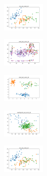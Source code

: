 \begin{figure}[H]    
    \centering
    \begin{subfigure}
        \centering
        \includegraphics[width=0.234\textwidth]{img/bl/iris_set_const_20_949004259_clust.png}
    \end{subfigure}
    \hfill
    \begin{subfigure}
        \centering
        \includegraphics[width=0.234\textwidth]{img/bl/ecoli_set_const_20_949004259_clust.png}
    \end{subfigure}
    \hfill
    \begin{subfigure}
        \centering
        \includegraphics[width=0.234\textwidth]{img/bl/rand_set_const_20_949004259_clust.png}
    \end{subfigure}
    \hfill
    \begin{subfigure}
        \centering
        \includegraphics[width=0.234\textwidth]{img/bl/newthyroid_set_const_20_949004259_clust.png}
    \end{subfigure}
    \hfill
    \begin{subfigure}
        \centering
        \includegraphics[width=0.234\textwidth]{img/bl/iris_set_const_20_589741062_clust.png}
    \end{subfigure}
    \hfill
    \begin{subfigure}

\end{subfigure}
\end{figure}
